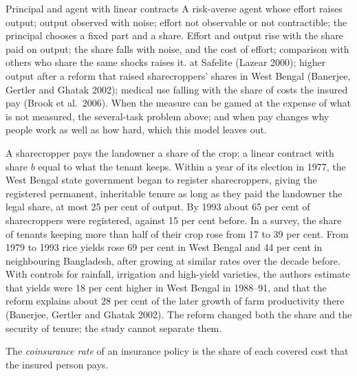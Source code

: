 \begin{model}{Principal and agent with linear contracts}
\assumes A risk-averse agent whose effort raises output; output observed with noise; effort not observable or not
contractible; the principal chooses a fixed part and a share.
\predicts Effort and output rise with the share paid on output; the share falls with noise,  and the cost
of effort; comparison with others who share the same shocks raises it.
\tested {} at Safelite (Lazear 2000); higher output after a reform that raised sharecroppers' shares in West Bengal
(Banerjee, Gertler and Ghatak 2002); medical use falling with the share of costs the insured pay (Brook et al.\ 2006).
\breaks When the measure can be gamed at the expense of what is not measured, the several-task problem above; and when pay
changes why people work as well as how hard, which this model leaves out.
\end{model}

\begin{record}
A sharecropper pays the landowner a share of the crop: a linear contract with share $b$ equal to what the tenant keeps. Within a year of its election in 1977, the West Bengal state government began to register sharecroppers, giving the registered permanent, inheritable
tenure as long as they paid the landowner the legal share, at most 25 per cent of output. By 1993 about 65 per cent of
sharecroppers were registered, against 15 per cent before. In a survey, the share of tenants keeping more than half of
their crop rose from 17 to 39 per cent. From 1979 to 1993 rice yields rose 69 per cent in West Bengal and 44 per cent in
neighbouring Bangladesh, after growing at similar rates over the decade before. With controls for rainfall, irrigation and
high-yield varieties, the authors estimate that yields were 18 per cent higher in West Bengal in 1988--91, and that the reform
explains about 28 per cent of the later growth of farm productivity there (Banerjee, Gertler and Ghatak 2002). The reform changed
both the share and the security of tenure; the study cannot separate them.
\end{record}

\begin{definition}\label{def:b2:moral-hazard:coinsurance}
The \emph{coinsurance rate} of an insurance policy is the share of each covered cost that the
insured person pays.
\end{definition}

